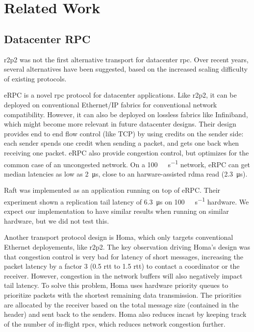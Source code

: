 \chapter{Related Work}\label{chap:related-work}

\section{Datacenter RPC}

\gls{r2p2} was not the first alternative transport for datacenter \gls{rpc}.
Over recent years, several alternatives have been suggested, based on the increased scaling difficulty of existing protocols.

eRPC\cite{erpc} is a novel \gls{rpc} protocol for datacenter applications.
Like \gls{r2p2}, it can be deployed on conventional Ethernet/IP fabrics for conventional network compatibility.
However, it can also be deployed on lossless fabrics like Infiniband, which might become more relevant in future datacenter designs.
Their design provides end to end flow control (like TCP) by using credits on the sender side: each sender spends one credit when sending a packet, and gets one back when receiving one packet.
eRPC also provide congestion control, but optimizes for the common case of an uncongested network.
On a \SI{100}{\giga\bit\per\second} network, eRPC can get median latencies as low as \SI{2}{\micro\second}, close to an harware-assisted \gls{rdma} read (\SI{2.3}{\micro\second}).

Raft was implemented as an application running on top of eRPC.
Their experiment shown a replication tail latency of \SI{6.3}{\micro\second} on \SI{100}{\giga\bit\per\second} hardware.
We expect our implementation to have similar results when running on similar hardware, but we did not test this.

Another transport protocol design is Homa\cite{homa}, which only targets conventional Ethernet deployements, like \gls{r2p2}.
The key observation driving Homa's design was that congestion control is very bad for latency of short messages, increasing the packet latency by a factor 3 (0.5 \gls{rtt} to 1.5 \gls{rtt}) to contact a coordinator or the receiver.
However, congestion in the network buffers will also negatively impact tail latency.
To solve this problem, Homa uses hardware priority queues to prioritize packets with the shortest remaining data transmission.
The priorities are allocated by the receiver based on the total message size (contained in the header) and sent back to the senders.
Homa also reduces incast by keeping track of the number of in-flight \glspl{rpc}, which reduces network congestion further.


